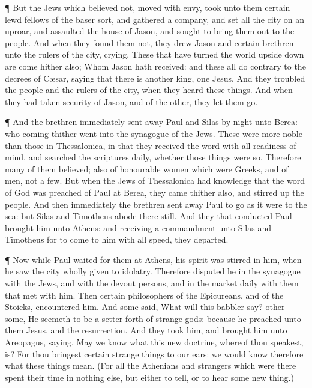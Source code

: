  ¶ But the Jews which believed not, moved with envy, took
unto them certain lewd fellows of the baser sort, and gathered a
company, and set all the city on an uproar, and assaulted the house of
Jason, and sought to bring them out to the people.  And when
they found them not, they drew Jason and certain brethren unto the
rulers of the city, crying, These that have turned the world upside down
are come hither also;  Whom Jason hath received: and these
all do contrary to the decrees of Cæsar, saying that there is another
king, one Jesus.  And they troubled the people and the
rulers of the city, when they heard these things.  And when
they had taken security of Jason, and of the other, they let them go.

 ¶ And the brethren immediately sent away Paul and Silas by
night unto Berea: who coming thither went into the synagogue of the
Jews.  These were more noble than those in Thessalonica, in
that they received the word with all readiness of mind, and searched the
scriptures daily, whether those things were so.  Therefore
many of them believed; also of honourable women which were Greeks, and
of men, not a few.  But when the Jews of Thessalonica had
knowledge that the word of God was preached of Paul at Berea, they came
thither also, and stirred up the people.  And then
immediately the brethren sent away Paul to go as it were to the sea: but
Silas and Timotheus abode there still.  And they that
conducted Paul brought him unto Athens: and receiving a commandment unto
Silas and Timotheus for to come to him with all speed, they departed.

 ¶ Now while Paul waited for them at Athens, his spirit was
stirred in him, when he saw the city wholly given to idolatry.
 Therefore disputed he in the synagogue with the Jews, and
with the devout persons, and in the market daily with them that met with
him.  Then certain philosophers of the Epicureans, and of
the Stoicks, encountered him. And some said, What will this babbler say?
other some, He seemeth to be a setter forth of strange gods: because he
preached unto them Jesus, and the resurrection.  And they
took him, and brought him unto Areopagus, saying, May we know what this
new doctrine, whereof thou speakest, is?  For thou bringest
certain strange things to our ears: we would know therefore what these
things mean.  (For all the Athenians and strangers which
were there spent their time in nothing else, but either to tell, or to
hear some new thing.)

